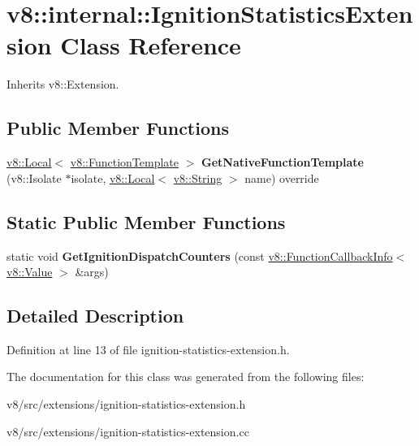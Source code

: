 \hypertarget{classv8_1_1internal_1_1IgnitionStatisticsExtension}{}\section{v8\+:\+:internal\+:\+:Ignition\+Statistics\+Extension Class Reference}
\label{classv8_1_1internal_1_1IgnitionStatisticsExtension}


Inherits v8\+::\+Extension.

\subsection*{Public Member Functions}
\begin{DoxyCompactItemize}
\item 
\mbox{\label{classv8_1_1internal_1_1IgnitionStatisticsExtension_a036370007e678bb61c1d64f2bf83c55b}} 
\mbox{\hyperlink{classv8_1_1Local}{v8\+::\+Local}}$<$ \mbox{\hyperlink{classv8_1_1FunctionTemplate}{v8\+::\+Function\+Template}} $>$ {\bfseries Get\+Native\+Function\+Template} (v8\+::\+Isolate $\ast$isolate, \mbox{\hyperlink{classv8_1_1Local}{v8\+::\+Local}}$<$ \mbox{\hyperlink{classv8_1_1String}{v8\+::\+String}} $>$ name) override
\end{DoxyCompactItemize}
\subsection*{Static Public Member Functions}
\begin{DoxyCompactItemize}
\item 
\mbox{\label{classv8_1_1internal_1_1IgnitionStatisticsExtension_a19a01d41059e9ab8539e1fdfdfdfb554}} 
static void {\bfseries Get\+Ignition\+Dispatch\+Counters} (const \mbox{\hyperlink{classv8_1_1FunctionCallbackInfo}{v8\+::\+Function\+Callback\+Info}}$<$ \mbox{\hyperlink{classv8_1_1Value}{v8\+::\+Value}} $>$ \&args)
\end{DoxyCompactItemize}


\subsection{Detailed Description}


Definition at line 13 of file ignition-\/statistics-\/extension.\+h.



The documentation for this class was generated from the following files\+:\begin{DoxyCompactItemize}
\item 
v8/src/extensions/ignition-\/statistics-\/extension.\+h\item 
v8/src/extensions/ignition-\/statistics-\/extension.\+cc\end{DoxyCompactItemize}
